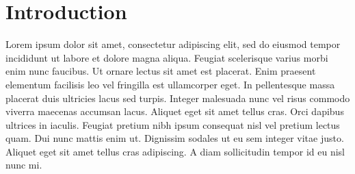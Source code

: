 \section{Introduction}\label{sect:intro}

Lorem ipsum dolor sit amet, consectetur adipiscing elit, sed do eiusmod tempor incididunt ut labore et dolore magna aliqua. Feugiat scelerisque varius morbi enim nunc faucibus. Ut ornare lectus sit amet est placerat. Enim praesent elementum facilisis leo vel fringilla est ullamcorper eget. In pellentesque massa placerat duis ultricies lacus sed turpis. Integer malesuada nunc vel risus commodo viverra maecenas accumsan lacus. Aliquet eget sit amet tellus cras. Orci dapibus ultrices in iaculis. Feugiat pretium nibh ipsum consequat nisl vel pretium lectus quam. Dui nunc mattis enim ut. Dignissim sodales ut eu sem integer vitae justo. Aliquet eget sit amet tellus cras adipiscing. A diam sollicitudin tempor id eu nisl nunc mi.~\cite{anzt2020ginkgo}
